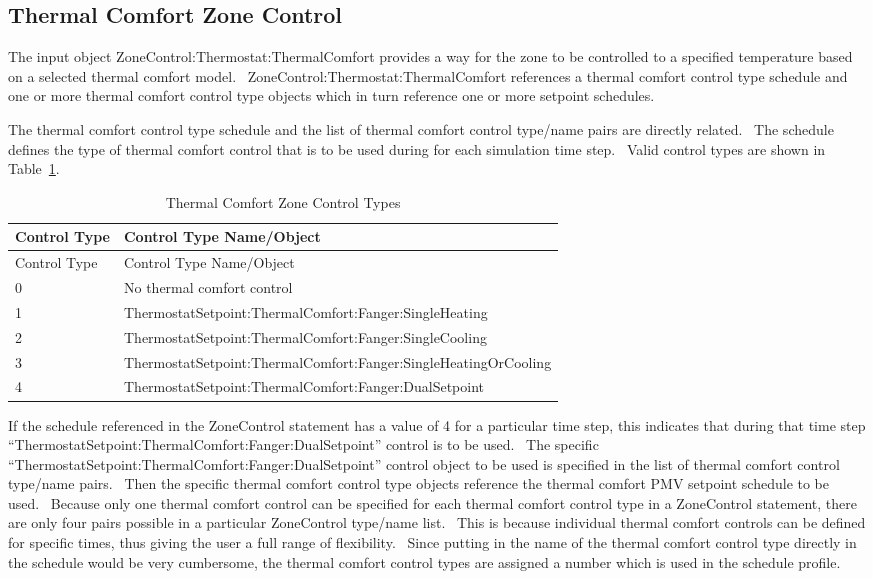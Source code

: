 \subsection{Thermal Comfort Zone Control}\label{thermal-comfort-zone-control}

The input object ZoneControl:Thermostat:ThermalComfort provides a way for the zone to be controlled to a specified temperature based on a selected thermal comfort model.~ ZoneControl:Thermostat:ThermalComfort references a thermal comfort control type schedule and one or more thermal comfort control type objects which in turn reference one or more setpoint schedules.

The thermal comfort control type schedule and the list of thermal comfort control type/name pairs are directly related.~ The schedule defines the type of thermal comfort control that is to be used during for each simulation time step.~ Valid control types are shown in Table~\ref{table:thermal-comfort-zone-control-types}.

\begin{longtable}[c]{p{1.0in}p{5.0in}}
\caption{Thermal Comfort Zone Control Types \label{table:thermal-comfort-zone-control-types}} \tabularnewline
\toprule
Control Type & Control Type Name/Object \tabularnewline
\midrule
\endfirsthead

\toprule
Control Type & Control Type Name/Object \tabularnewline
\midrule
\endhead

0 & No thermal comfort control \tabularnewline
1 & ThermostatSetpoint:ThermalComfort:Fanger:SingleHeating \tabularnewline
2 & ThermostatSetpoint:ThermalComfort:Fanger:SingleCooling \tabularnewline
3 & ThermostatSetpoint:ThermalComfort:Fanger:SingleHeatingOrCooling \tabularnewline
4 & ThermostatSetpoint:ThermalComfort:Fanger:DualSetpoint \tabularnewline
\bottomrule
\end{longtable}

If the schedule referenced in the ZoneControl statement has a value of 4 for a particular time step, this indicates that during that time step ``ThermostatSetpoint:ThermalComfort:Fanger:DualSetpoint'' control is to be used.~ The specific ``ThermostatSetpoint:ThermalComfort:Fanger:DualSetpoint'' control object to be used is specified in the list of thermal comfort control type/name pairs.~ Then the specific thermal comfort control type objects reference the thermal comfort PMV setpoint schedule to be used.~ Because only one thermal comfort control can be specified for each thermal comfort control type in a ZoneControl statement, there are only four pairs possible in a particular ZoneControl type/name list.~ This is because individual thermal comfort controls can be defined for specific times, thus giving the user a full range of flexibility.~ Since putting in the name of the thermal comfort control type directly in the schedule would be very cumbersome, the thermal comfort control types are assigned a number which is used in the schedule profile.

